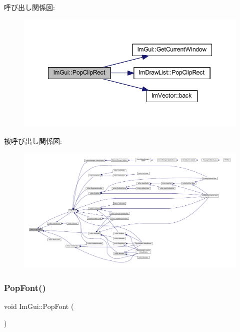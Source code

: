 呼び出し関係図\+:\nopagebreak
\begin{figure}[H]
\begin{center}
\leavevmode
\includegraphics[width=348pt]{namespace_im_gui_aef1c8a6e5a3c70cb10d03d2a2a66dfd8_cgraph}
\end{center}
\end{figure}
被呼び出し関係図\+:
\nopagebreak
\begin{figure}[H]
\begin{center}
\leavevmode
\includegraphics[width=350pt]{namespace_im_gui_aef1c8a6e5a3c70cb10d03d2a2a66dfd8_icgraph}
\end{center}
\end{figure}
\mbox{\label{namespace_im_gui_af66649bc37022bf3cf2496c73af9a499}} 
\subsubsection{\texorpdfstring{Pop\+Font()}{PopFont()}}
{\footnotesize\ttfamily void Im\+Gui\+::\+Pop\+Font (\begin{DoxyParamCaption}{ }\end{DoxyParamCaption})}



